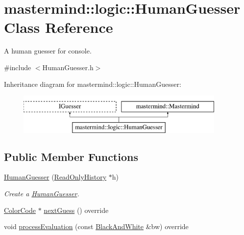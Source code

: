 \hypertarget{classmastermind_1_1logic_1_1_human_guesser}{}\section{mastermind\+:\+:logic\+:\+:Human\+Guesser Class Reference}
\label{classmastermind_1_1logic_1_1_human_guesser}


A human guesser for console.  




{\ttfamily \#include $<$Human\+Guesser.\+h$>$}

Inheritance diagram for mastermind\+:\+:logic\+:\+:Human\+Guesser\+:\begin{figure}[H]
\begin{center}
\leavevmode
\includegraphics[height=2.000000cm]{classmastermind_1_1logic_1_1_human_guesser}
\end{center}
\end{figure}
\subsection*{Public Member Functions}
\begin{DoxyCompactItemize}
\item 
\hyperlink{classmastermind_1_1logic_1_1_human_guesser_a877ab01fca174b802a041cfabf16e468}{Human\+Guesser} (\hyperlink{classmastermind_1_1logic_1_1_read_only_history}{Read\+Only\+History} $\ast$h)
\begin{DoxyCompactList}\small\item\em Create a \hyperlink{classmastermind_1_1logic_1_1_human_guesser}{Human\+Guesser}. \end{DoxyCompactList}\item 
\hyperlink{classmastermind_1_1logic_1_1_color_code}{Color\+Code} $\ast$ \hyperlink{classmastermind_1_1logic_1_1_human_guesser_a5a165250f667fd40099c43cd3caf487c}{next\+Guess} () override
\item 
void \hyperlink{classmastermind_1_1logic_1_1_human_guesser_ad1c868e2dac07c1af9bb8935783e2e9b}{process\+Evaluation} (const \hyperlink{classmastermind_1_1logic_1_1_black_and_white}{Black\+And\+White} \&bw) override
\end{DoxyCompactItemize}
